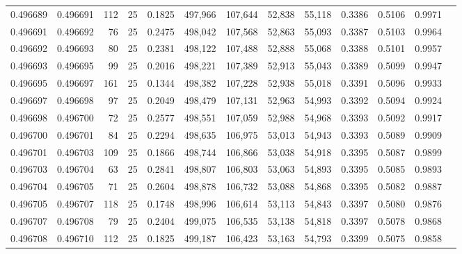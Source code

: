 \begin{tabular}{rrrrrrrrrrrrr}
0.496689 & 0.496691 &   112 &  25 &                                     0.1825 & 497,966 & 107,644 &  52,838 &  55,118 & 0.3386 & 0.5106 & 0.9971 \\
0.496691 & 0.496692 &    76 &  25 &                                     0.2475 & 498,042 & 107,568 &  52,863 &  55,093 & 0.3387 & 0.5103 & 0.9964 \\
0.496692 & 0.496693 &    80 &  25 &                                     0.2381 & 498,122 & 107,488 &  52,888 &  55,068 & 0.3388 & 0.5101 & 0.9957 \\
0.496693 & 0.496695 &    99 &  25 &                                     0.2016 & 498,221 & 107,389 &  52,913 &  55,043 & 0.3389 & 0.5099 & 0.9947 \\
0.496695 & 0.496697 &   161 &  25 &                                     0.1344 & 498,382 & 107,228 &  52,938 &  55,018 & 0.3391 & 0.5096 & 0.9933 \\
0.496697 & 0.496698 &    97 &  25 &                                     0.2049 & 498,479 & 107,131 &  52,963 &  54,993 & 0.3392 & 0.5094 & 0.9924 \\
0.496698 & 0.496700 &    72 &  25 &                                     0.2577 & 498,551 & 107,059 &  52,988 &  54,968 & 0.3393 & 0.5092 & 0.9917 \\
0.496700 & 0.496701 &    84 &  25 &                                     0.2294 & 498,635 & 106,975 &  53,013 &  54,943 & 0.3393 & 0.5089 & 0.9909 \\
0.496701 & 0.496703 &   109 &  25 &                                     0.1866 & 498,744 & 106,866 &  53,038 &  54,918 & 0.3395 & 0.5087 & 0.9899 \\
0.496703 & 0.496704 &    63 &  25 &                                     0.2841 & 498,807 & 106,803 &  53,063 &  54,893 & 0.3395 & 0.5085 & 0.9893 \\
0.496704 & 0.496705 &    71 &  25 &                                     0.2604 & 498,878 & 106,732 &  53,088 &  54,868 & 0.3395 & 0.5082 & 0.9887 \\
0.496705 & 0.496707 &   118 &  25 &                                     0.1748 & 498,996 & 106,614 &  53,113 &  54,843 & 0.3397 & 0.5080 & 0.9876 \\
0.496707 & 0.496708 &    79 &  25 &                                     0.2404 & 499,075 & 106,535 &  53,138 &  54,818 & 0.3397 & 0.5078 & 0.9868 \\
0.496708 & 0.496710 &   112 &  25 &                                     0.1825 & 499,187 & 106,423 &  53,163 &  54,793 & 0.3399 & 0.5075 & 0.9858 \\

\end{tabular}

